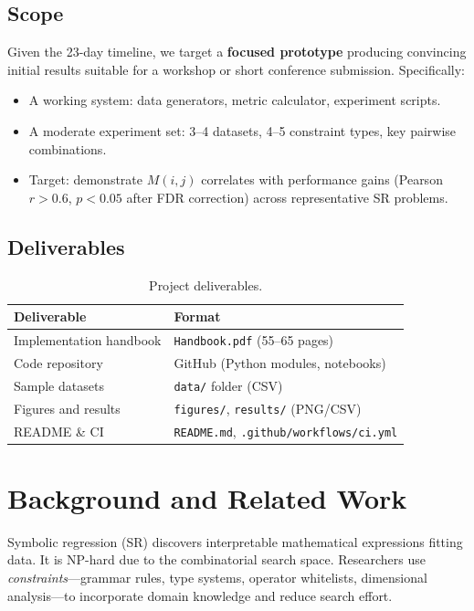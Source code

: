 \documentclass[11pt,a4paper]{article}
\begin{document}
\subsection{Scope}
Given the 23-day timeline, we target a \textbf{focused prototype} producing convincing initial results suitable for a workshop or short conference submission. Specifically:
\begin{itemize}
  \item A working system: data generators, metric calculator, experiment scripts.
  \item A moderate experiment set: 3--4 datasets, 4--5 constraint types, key pairwise combinations.
  \item Target: demonstrate $M(i,j)$ correlates with performance gains (Pearson $r > 0.6$, $p < 0.05$ after FDR correction) across representative SR problems.
\end{itemize}

\subsection{Deliverables}
\begin{table}[h]
\centering\small
\begin{tabularx}{\textwidth}{lX}
\toprule
\textbf{Deliverable} & \textbf{Format} \\
\midrule
Implementation handbook & \texttt{Handbook.pdf} (55--65 pages) \\
Code repository & GitHub (Python modules, notebooks) \\
Sample datasets & \texttt{data/} folder (CSV) \\
Figures and results & \texttt{figures/}, \texttt{results/} (PNG/CSV) \\
README \& CI & \texttt{README.md}, \texttt{.github/workflows/ci.yml} \\
\bottomrule
\end{tabularx}
\caption{Project deliverables.}
\end{table}

\section{Background and Related Work}
\label{sec:background}

Symbolic regression (SR) discovers interpretable mathematical expressions fitting data. It is NP-hard due to the combinatorial search space. Researchers use \textit{constraints}---grammar rules, type systems, operator whitelists, dimensional analysis---to incorporate domain knowledge and reduce search effort.
\end{document}
